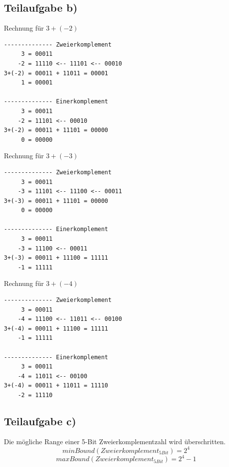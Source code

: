 \documentclass{llncs}
\begin{document}
\subsection*{Teilaufgabe b)}

Rechnung f\"ur $3+(-2)$
\begin{verbatim}
-------------- Zweierkomplement
     3 = 00011
    -2 = 11110 <-- 11101 <-- 00010
3+(-2) = 00011 + 11011 = 00001
     1 = 00001
     
-------------- Einerkomplement
     3 = 00011
    -2 = 11101 <-- 00010
3+(-2) = 00011 + 11101 = 00000
     0 = 00000
\end{verbatim}
Rechnung f\"ur $3+(-3)$
\begin{verbatim}
-------------- Zweierkomplement
     3 = 00011
    -3 = 11101 <-- 11100 <-- 00011
3+(-3) = 00011 + 11101 = 00000
     0 = 00000

-------------- Einerkomplement
     3 = 00011
    -3 = 11100 <-- 00011
3+(-3) = 00011 + 11100 = 11111
    -1 = 11111
\end{verbatim}
Rechnung f\"ur $3+(-4)$
\begin{verbatim}
-------------- Zweierkomplement
     3 = 00011
    -4 = 11100 <-- 11011 <-- 00100
3+(-4) = 00011 + 11100 = 11111
    -1 = 11111
    
-------------- Einerkomplement
     3 = 00011
    -4 = 11011 <-- 00100
3+(-4) = 00011 + 11011 = 11110
    -2 = 11110
\end{verbatim}

\subsection*{Teilaufgabe c)}

Die m\"ogliche Range einer 5-Bit Zweierkomplementzahl wird \"uberschritten.\\
$$minBound(Zweierkomplement_{5 Bit}) = 2^{4}$$
$$maxBound(Zweierkomplement_{5 Bit}) = 2^{4} -1$$
\end{document}
